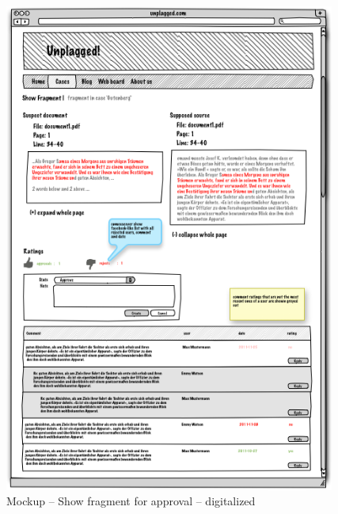 \begin{appendix}
\begin{figure}[tbp]
  \centering
    \includegraphics[width=0.97\textwidth]{mockups/4_show_fragment_for_approval.png}
  \caption{Mockup – Show fragment for approval – digitalized }
  \label{fig:4showFragmentForApprovalMockup}
\end{figure}


\end{appendix}

